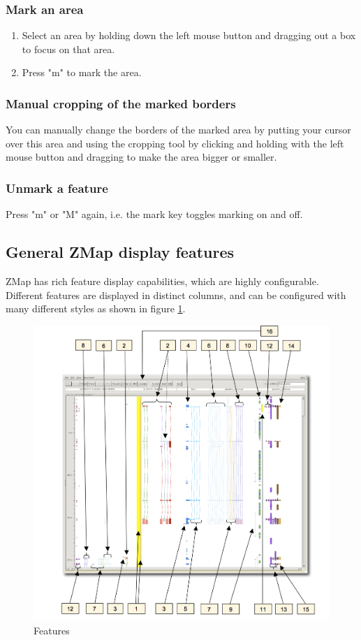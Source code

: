 \documentclass[letterpaper]{article}
\begin{document}
\subsubsection{Mark an area}
\begin{enumerate}
\item Select an area by holding down the left mouse button and dragging out a box to focus on that area.
\item Press "m" to mark the area.
\end{enumerate}

\subsubsection{Manual cropping of the marked borders}
You can manually change the borders of the marked area by putting your cursor over this area and using the cropping tool by clicking and holding with the left mouse button and dragging to make the area bigger or smaller.

\subsubsection{Unmark a feature}
Press "m" or "M" again, i.e. the mark key toggles marking on and off.

\subsection{General ZMap display features}
ZMap has rich feature display capabilities, which are highly configurable. Different features are displayed in distinct columns, and can be configured with many different styles as shown in figure \ref{img_features}. 

\begin{figure}
\centering
\color[rgb]{0.30980393,0.5058824,0.7411765}
\includegraphics[width=15.231cm]{img_features.png}
\caption{Features}
\label{img_features}
\end{figure}
\end{document}
